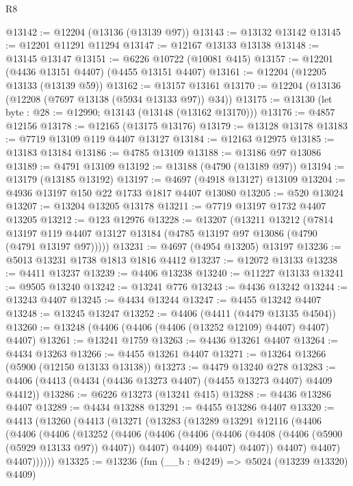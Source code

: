 \begin{lexlean}{R8}
\begin{coremodule}
@13142 := @12204 (@13136 (@13139 @97))
@13143 := @13132 @13142
@13145 := @12201 @11291 @11294
@13147 := @12167 @13133 @13138
@13148 := @13145 @13147
@13151 := @6226 @10722 (@10081 @415)
@13157 := @12201 (@4436 @13151 @4407) (@4455 @13151 @4407)
@13161 := @12204 (@12205 @13133 (@13139 @59))
@13162 := @13157 @13161
@13170 := @12204 (@13136 (@12208 (@7697 @13138 (@5934 @13133 @97)) @34))
@13175 := @13130 (let byte : @28 := @12990; @13143 (@13148 (@13162 @13170)))
@13176 := @4857 @12156
@13178 := @12165 (@13175 @13176)
@13179 := @13128 @13178
@13183 := @7719 @13109 @119 @4407 @13127
@13184 := @12163 @12975
@13185 := @13183 @13184
@13186 := @4785 @13109
@13188 := @13186 @97 @13086
@13189 := @4791 @13109
@13192 := @13188 (@4790 (@13189 @97))
@13194 := @13179 (@13185 @13192)
@13197 := @4697 (@4918 @13127) @13109
@13204 := @4936 @13197 @150 @22 @1733 @1817 @4407 @13080
@13205 := @520 @13024
@13207 := @13204 @13205 @13178
@13211 := @7719 @13197 @1732 @4407 @13205
@13212 := @123 @12976
@13228 := @13207
    (@13211
      @13212
      (@7814 @13197 @119 @4407 @13127 @13184 (@4785 @13197 @97 @13086 (@4790 (@4791 @13197 @97)))))
@13231 := @4697 (@4954 @13205) @13197
@13236 := @5013 @13231 @1738 @1813 @1816 @4412
@13237 := @12072 @13133
@13238 := @4411 @13237
@13239 := @4406 @13238
@13240 := @11227 @13133
@13241 := @9505 @13240
@13242 := @13241 @776
@13243 := @4436 @13242
@13244 := @13243 @4407
@13245 := @4434 @13244
@13247 := @4455 @13242 @4407
@13248 := @13245 @13247
@13252 := @4406 (@4411 (@4479 @13135 @4504))
@13260 := @13248 (@4406 (@4406 (@4406 (@13252 @12109) @4407) @4407) @4407)
@13261 := @13241 @1759
@13263 := @4436 @13261 @4407
@13264 := @4434 @13263
@13266 := @4455 @13261 @4407
@13271 := @13264 @13266 (@5900 (@12150 @13133 @13138))
@13273 := @4479 @13240 @278
@13283 := @4406 (@4413 (@4434 (@4436 @13273 @4407) (@4455 @13273 @4407) @4409 @4412))
@13286 := @6226 @13273 (@13241 @415)
@13288 := @4436 @13286 @4407
@13289 := @4434 @13288
@13291 := @4455 @13286 @4407
@13320 := @4413
    (@13260
      (@4413
        (@13271
          (@13283
            (@13289
              @13291
              @12116
              (@4406
                (@4406
                  (@4406
                    (@13252
                      (@4406
                        (@4406
                          (@4406
                            (@4406 (@4408 (@4406 (@5900 (@5929 @13133 @97)) @4407)) @4407)
                            @4409)
                          @4407)
                        @4407))
                    @4407)
                  @4407)
                @4407))))))
@13325 := @13236 (fun (__b : @4249) => @5024 (@13239 @13320) @4409)

\end{coremodule}
\end{lexlean}
